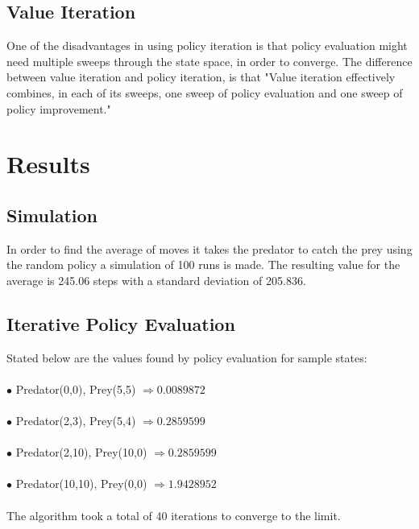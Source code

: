 \documentclass[11pt]{article}
\begin{document}
\subsection{Value Iteration}
One of the disadvantages in using policy iteration is that policy evaluation might need multiple sweeps through the state space, in order to converge. The difference between value iteration and policy iteration, is that "Value iteration effectively combines, in each of its sweeps, one sweep of policy evaluation and one sweep of policy improvement." \\



\section{Results\\}


\subsection{Simulation}
In order to find the average of moves it takes the predator to catch the prey using the random policy a simulation of 100 runs is made. The resulting value for the average is 245.06 steps with a standard deviation of 205.836.\\



\subsection{Iterative Policy Evaluation}


Stated below are the values found by policy evaluation for sample states:\\\\
$\bullet$ Predator(0,0), Prey(5,5) $\Rightarrow 0.0089872$\\\\
$\bullet$ Predator(2,3), Prey(5,4) $\Rightarrow  0.2859599$\\\\
$\bullet$ Predator(2,10), Prey(10,0) $\Rightarrow  0.2859599$\\\\
$\bullet$ Predator(10,10), Prey(0,0) $\Rightarrow  1.9428952$\\\\
The algorithm took a total of 40 iterations to converge to the limit.\\
\end{document}
